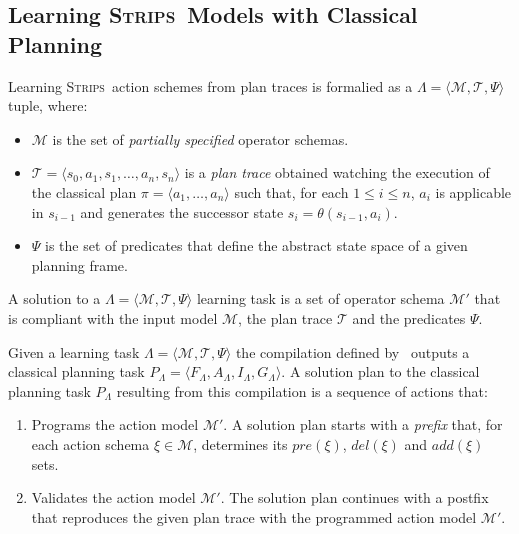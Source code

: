 \documentclass[letterpaper]{article} %
\newcommand{\tup}[1]{{\langle #1 \rangle}}
\newcommand{\strips}{\textsc{Strips}}     %
\begin{document}
\subsection{Learning \strips\ Models with Classical Planning}
Learning \strips\ action schemes from plan traces is formalied as a $\Lambda=\tup{\mathcal{M},\mathcal{T},\Psi}$ tuple, where:
\begin{itemize}
\item $\mathcal{M}$ is the set of {\em partially specified} operator schemas.
\item $\mathcal{T}=\tup{s_0,a_1,s_1,\ldots,a_n,s_{n}}$ is a {\em plan trace} obtained watching the execution of the classical plan $\pi=\tup{a_1, \ldots, a_n}$ such that, for each {\small $1\leq i\leq n$}, $a_i$ is applicable in $s_{i-1}$ and generates the successor state $s_i=\theta(s_{i-1},a_i)$. 
\item $\Psi$ is the set of predicates that define the abstract state space of a given planning frame. 
\end{itemize}

A solution to a $\Lambda=\tup{\mathcal{M},\mathcal{T},\Psi}$ learning task is a set of operator schema $\mathcal{M}'$ that is compliant with the input model $\mathcal{M}$, the plan trace $\mathcal{T}$ and the predicates $\Psi$. 

Given a learning task $\Lambda=\tup{\mathcal{M},\mathcal{T},\Psi}$ the compilation defined by~\citeauthor{aineto:learningSTRIPS:ICAPS2018} outputs a classical planning task $P_{\Lambda}=\tup{F_{\Lambda},A_{\Lambda},I_{\Lambda},G_{\Lambda}}$. A solution plan to the classical planning task $P_{\Lambda}$ resulting from this compilation is a sequence of actions that:
\begin{enumerate}
\item Programs the action model $\mathcal{M}'$. A solution plan starts with a {\em prefix} that, for each action schema $\xi\in\mathcal{M}$, determines its $pre(\xi)$, $del(\xi)$ and $add(\xi)$ sets.
\item Validates the action model $\mathcal{M}'$. The solution plan continues with a postfix that reproduces the given plan trace with the programmed action model $\mathcal{M}'$.
\end{enumerate}
\end{document}
